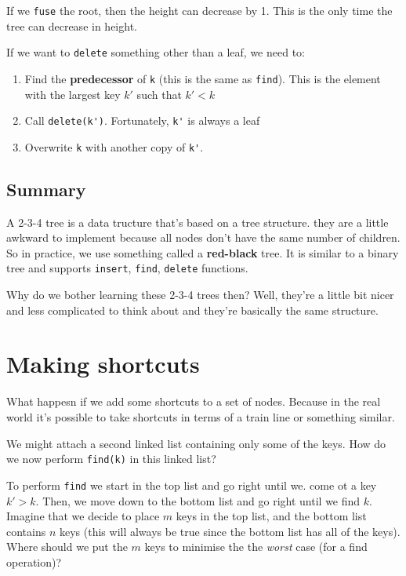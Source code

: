 \documentclass[11pt,a4paper,titlepage,dvipsnames,cmyk]{scrartcl}
\begin{document}
If we \lstinline|fuse| the root, then the height can decrease by 1. This
is the only time the tree can decrease in height.

If we want to \lstinline|delete| something other than a leaf, we need to:
\begin{enumerate}
    \item Find the \textbf{predecessor} of \lstinline|k| (this is the same
        as \lstinline|find|). This is the element with the largest key
        $k'$ such that $k' < k$
    \item Call \lstinline|delete(k')|. Fortunately, \lstinline|k'| is
        always a leaf
    \item Overwrite \lstinline|k| with another copy of \lstinline|k'|.
\end{enumerate}

\subsection{Summary}%
\label{sub:Summary}
A 2-3-4 tree is a data tructure that's based on a tree structure. they are
a little awkward to implement because all nodes don't have the same number
of children. So in practice, we use something called a
\textbf{red-black} tree. It is similar to a binary tree and supports
\lstinline|insert|, \lstinline|find|, \lstinline|delete| functions.

Why do we bother learning these 2-3-4 trees then? Well, they're a little
bit nicer and less complicated to think about and they're basically the
same structure.

\section{Making shortcuts}%
\label{sec:shortcuts}
What happesn if we add some shortcuts to a set of nodes. Because in the
real world it's possible to take shortcuts in terms of a train line or
something similar.

We might attach a second linked list containing only some of the keys. How
do we now perform \lstinline|find(k)| in this linked list?

To perform \lstinline|find| we start in the top list and go right until
we.  come ot a key $k' > k$. Then, we move down to the bottom list and go
right until we find $k$. Imagine that we decide to place $m$ keys in the
top list, and the bottom list contains $n$ keys (this will always be true
since the bottom list has all of the keys). Where should we put the $m$
keys to minimise the the \textit{worst} case (for a find operation)?
\end{document}
